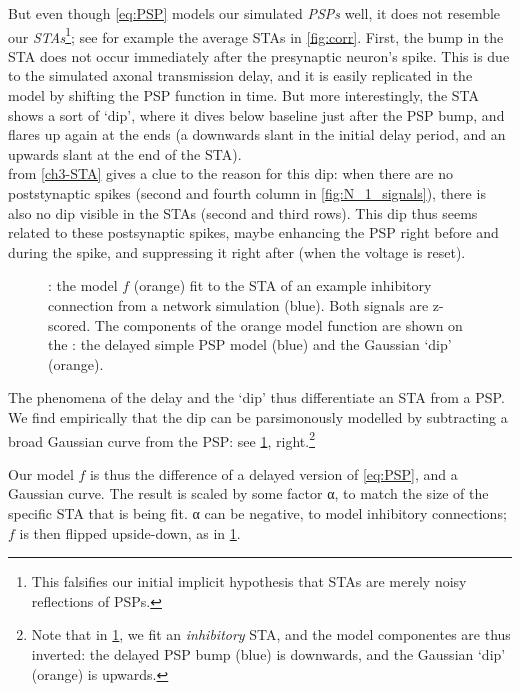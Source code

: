 But even though \cref{eq:PSP} models our simulated \emph{PSPs} well, it does not resemble our \emph{STAs}\footnote{
    This falsifies our initial implicit hypothesis that STAs are merely noisy reflections of PSPs.
};
see for example the average STAs in \cref{fig:corr}.
First, the bump in the STA does not occur immediately after the presynaptic neuron's spike. This is due to the simulated axonal transmission delay, and it is easily replicated in the model by shifting the PSP function in time. But more interestingly, the STA shows a sort of `dip', where it dives below baseline just after the PSP bump, and flares up again at the ends (a downwards slant in the initial delay period, and an upwards slant at the end of the STA).\\
 from \cref{ch3-STA} gives a clue to the reason for this dip: when there are no poststynaptic spikes (second and fourth column in \cref{fig:N_1_signals}), there is also no dip visible in the STAs (second and third rows). This dip thus seems related to these postsynaptic spikes, maybe enhancing the PSP right before and during the spike, and suppressing it right after (when the voltage is reset).

\begin{figure}
    {\Left: the model $f$ (orange) fit to the STA of an example inhibitory connection from a network simulation (blue). Both signals are z-scored.
    The components of the orange model function are shown on the
    \Right: the delayed simple PSP model (blue) and  the Gaussian `dip' (orange).}
    \label{fig:modelfit}
\end{figure}

The phenomena of the delay and the `dip' thus differentiate an STA from a PSP. We find empirically that the dip can be parsimonously modelled by subtracting a broad Gaussian curve from the PSP: see \cref{fig:modelfit}, right.\footnote{
    Note that in \cref{fig:modelfit}, we fit an \emph{inhibitory} STA, and the model componentes are thus inverted: the delayed PSP bump (blue) is downwards, and the Gaussian `dip' (orange) is upwards.
}

Our model $f$ is thus the difference of a delayed version of \cref{eq:PSP}, and a  Gaussian curve. The result is scaled by some factor α, to match the size of the specific STA that is being fit. α can be negative, to model inhibitory connections; $f$ is then flipped upside-down, as in \cref{fig:modelfit}.

